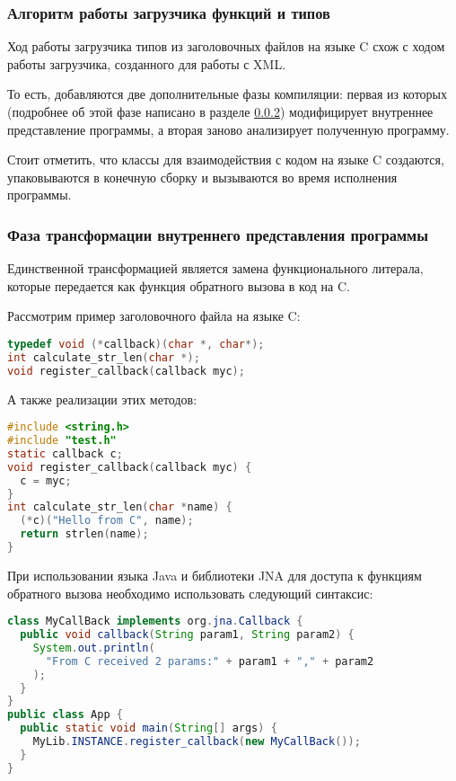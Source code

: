 \subsubsection{Алгоритм работы загрузчика функций и типов}

Ход работы загрузчика типов из заголовочных файлов на языке C схож с ходом работы загрузчика, созданного для работы с XML.

То есть, добавляются две дополнительные фазы компиляции: первая из которых (подробнее об этой фазе написано в разделе \ref{c-tranformation-phase}) модифицирует внутреннее представление программы, а вторая заново анализирует полученную программу.

Стоит отметить, что классы для взаимодействия с кодом на языке C создаются, упаковываются в конечную сборку и вызываются во время исполнения программы.

\subsubsection{Фаза трансформации внутреннего представления программы}\label{c-tranformation-phase}
Единственной трансформацией является замена функционального литерала, которые передается как функция обратного вызова в код на C.

Рассмотрим пример заголовочного файла на языке C:

\begin{lstlisting}[language=C, caption={Пример заголовочного файла на языке C с декларацией функции обратного вызова.}, label=callback-c-example]
typedef void (*callback)(char *, char*);
int calculate_str_len(char *);
void register_callback(callback myc);
\end{lstlisting}

А также реализации этих методов:
\begin{lstlisting}[language=C, caption={Реализация функции обратного вызова из примера~\ref{callback-c-example}.}, label=callback-c-example-impl]
#include <string.h>
#include "test.h"
static callback c;
void register_callback(callback myc) {
  c = myc;
}
int calculate_str_len(char *name) {
  (*c)("Hello from C", name);
  return strlen(name);
}
\end{lstlisting}

При использовании языка Java и библиотеки JNA для доступа к функциям обратного вызова необходимо использовать следующий синтаксис:
\begin{lstlisting}[language=Java, caption={Пример передачи функции обратного вызова в языке Java с использованием библиотеки JNA.}, label=java-callback-example]
class MyCallBack implements org.jna.Callback {
  public void callback(String param1, String param2) {
    System.out.println(
      "From C received 2 params:" + param1 + "," + param2
    );
  }
}
public class App {
  public static void main(String[] args) {
    MyLib.INSTANCE.register_callback(new MyCallBack());
  }
}
\end{lstlisting}

